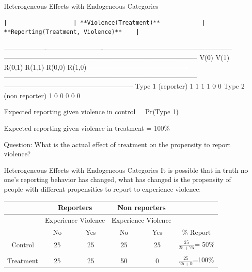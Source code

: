 \documentclass[
  11pt,
  ignorenonframetext,
]{beamer}
\begin{document}
\begin{frame}[fragile]{Heterogeneous Effects with Endogeneous
Categories}
\protect\hypertarget{heterogeneous-effects-with-endogeneous-categories-2}{}
\begin{verbatim}
|                   | **Violence(Treatment)**            | **Reporting(Treatment, Violence)**    |
\end{verbatim}

\textbar-------------------\textbar-------------------------\textbar-----------------------------\textbar-----------------------------\textbar-----------------------------\textbar-----------------------------\textbar-----------------------------\textbar{}
\textbar{} \textbar{} V(0) \textbar{} V(1) \textbar{} R(0,1) \textbar{}
R(1,1) \textbar{} R(0,0) \textbar{} R(1,0) \textbar{}
\textbar-------------------\textbar-------------------------\textbar-----------------------------\textbar-----------------------------\textbar-----------------------------\textbar-----------------------------\textbar-----------------------------\textbar{}
\textbar{} Type 1 (reporter) \textbar{} 1 \textbar{} 1 \textbar{} 1
\textbar{} 1 \textbar{} 0 \textbar{} 0 \textbar{} \textbar{} Type 2 (non
reporter)\textbar{} 1 \textbar{} 0 \textbar{} 0 \textbar{} 0 \textbar{}
0 \textbar{} 0 \textbar{}

Expected reporting given violence in control = Pr(Type 1)

Expected reporting given violence in treatment = 100\%

Question: What is the actual effect of treatment on the propensity to
report violence?
\end{frame}

\begin{frame}{Heterogeneous Effects with Endogeneous Categories}
\protect\hypertarget{heterogeneous-effects-with-endogeneous-categories-3}{}
It is possible that in truth no one's reporting behavior has changed,
what has changed is the propensity of people with different propensities
to report to experience violence:

\begin{table}
\centering
\begin{tabular}{c|cc|cc|c}\scriptsize

           & \multicolumn{ 2}{c}{Reporters} & \multicolumn{ 2}{c}{Non reporters} &            \\ \hline
           & \multicolumn{ 2}{c}{Experience Violence} & \multicolumn{ 2}{c}{Experience Violence} &            \\ \hline \hline
           &         No &        Yes &        No  &        Yes &  \% Report \\

   Control &         25 &         {25} &         25 &        {25} &       { $\frac{25}{25+25}$}= 50\% \\  
   & & & & \\
  Treatment &         25 &         {25} &         50 &          {0} &      {$\frac{25}{25+0}$}=100\% \\ \hline

\end{tabular}  
\end{table}
\end{frame}
\end{document}
